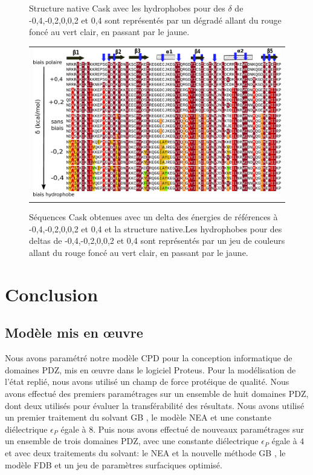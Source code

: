 \begin{figure}[!htbp]
  \centering
  \caption{\small Structure native Cask avec les hydrophobes pour des $\delta$ de -0,4,-0,2,0,0,2 et 0,4 sont représentés par un dégradé allant du rouge foncé au vert clair, en passant par le jaune.}

  \begin{tabular}{c}
    \includegraphics[width=15cm]{titration/alignCASK.pdf} \\
  \end{tabular}
  
  \caption{\small Séquences Cask obtenues avec un delta des énergies de références à -0,4,-0,2,0,0,2 et 0,4 et la structure native.Les hydrophobes pour des deltas de -0,4,-0,2,0,0,2 et 0,4 sont représentés par un jeu de couleurs allant du rouge foncé au vert clair, en passant par le jaune.}
  \label{titrAlignCask}
\end{figure}

%

\section{Conclusion}

\subsection{Modèle mis en œuvre}

Nous avons paramétré notre modèle CPD pour la conception informatique de domaines PDZ, mis en œuvre dans le logiciel Proteus. Pour la modélisation de l'état replié, nous avons utilisé un champ de force protéique de qualité. Nous avons effectué des premiers paramétrages sur un ensemble de huit domaines PDZ, dont deux utilisés  pour évaluer la transférabilité des résultats. Nous avons utilisé un premier traitement du solvant \og GB \fg, le modèle NEA et une constante diélectrique $\epsilon_P$  égale à $8$. Puis nous avons effectué de nouveaux paramétrages sur un ensemble de trois domaines PDZ, avec une constante diélectrique $\epsilon_P$  égale à $4$ et avec deux traitements du solvant: le NEA et la nouvelle méthode \og GB \fg, le modèle FDB et un jeu de paramètres surfaciques optimisé.

